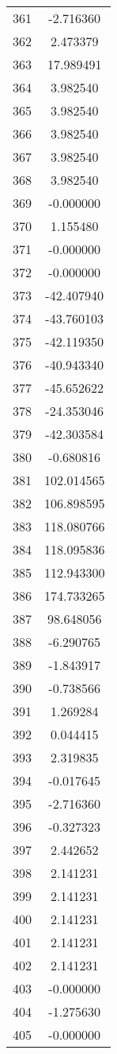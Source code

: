 \documentclass[12pt]{article}
\begin{document}
\begin{longtable}{@{}cc@{}}
361 & -2.716360 \\
362 & 2.473379 \\
363 & 17.989491 \\
364 & 3.982540 \\
365 & 3.982540 \\
366 & 3.982540 \\
367 & 3.982540 \\
368 & 3.982540 \\
369 & -0.000000 \\
370 & 1.155480 \\
371 & -0.000000 \\
372 & -0.000000 \\
373 & -42.407940 \\
374 & -43.760103 \\
375 & -42.119350 \\
376 & -40.943340 \\
377 & -45.652622 \\
378 & -24.353046 \\
379 & -42.303584 \\
380 & -0.680816 \\
381 & 102.014565 \\
382 & 106.898595 \\
383 & 118.080766 \\
384 & 118.095836 \\
385 & 112.943300 \\
386 & 174.733265 \\
387 & 98.648056 \\
388 & -6.290765 \\
389 & -1.843917 \\
390 & -0.738566 \\
391 & 1.269284 \\
392 & 0.044415 \\
393 & 2.319835 \\
394 & -0.017645 \\
395 & -2.716360 \\
396 & -0.327323 \\
397 & 2.442652 \\
398 & 2.141231 \\
399 & 2.141231 \\
400 & 2.141231 \\
401 & 2.141231 \\
402 & 2.141231 \\
403 & -0.000000 \\
404 & -1.275630 \\
405 & -0.000000 \\

\end{longtable}
\end{document}
